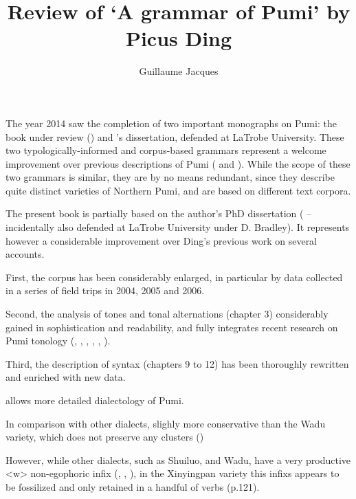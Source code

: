 \documentclass[oldfontcommands,oneside,a4paper,11pt]{article}
\begin{document}
\title{Review of `A grammar of Pumi' by Picus Ding}
\author{Guillaume Jacques}
\maketitle

\sloppy

The year 2014 saw the completion of two important monographs on Pumi: the book under review (\citealt{ding14grammar}) and \citet{daudey14grammar}'s dissertation, defended at LaTrobe University. These two typologically-informed and corpus-based grammars represent a welcome improvement over previous descriptions of Pumi (\citealt{fual98pumi} and   \citealt{lusz01pumi}). While the scope of these two grammars is similar, they are by no means redundant, since they describe quite distinct varieties of Northern Pumi, and are based on different text corpora.


The present book is partially based on the author's PhD dissertation (\citealt{ding98phd} -- incidentally also defended at LaTrobe University under D. Bradley). It represents however a considerable improvement over Ding's previous work on several accounts. 

First, the corpus has been considerably enlarged, in particular by data collected in a series of field trips in 2004, 2005 and 2006.

Second, the analysis of tones and tonal alternations (chapter 3)  considerably gained in sophistication and readability, and fully integrates recent research on Pumi tonology  (\citealt{matisoff97pumi},  \citealt{ding01pitch},  \citealt{ding03sketch}, \citealt{ding06tonal}, \citealt{ding07perception}, \citealt{jacques11pumi.tone}).

Third, the description of syntax (chapters 9 to 12) has been thoroughly rewritten and enriched with new data.  

allows more detailed dialectology of Pumi.
    
 In comparison with other dialects, slighly more conservative than the Wadu variety, which does not preserve any clusters (\citealt[20-1]{daudey14grammar})
 
 
However, while other dialects, such as Shuiluo, and Wadu, have a very productive <w> non-egophoric infix (\citealt{jacques11pumi.tone}, \citealt[338]{daudey14grammar}, \citealt[80]{daudey14volition}), in the Xinyingpan variety this infixs appears to be fossilized and only retained in a handful of verbs (p.121).
 
\end{document}
